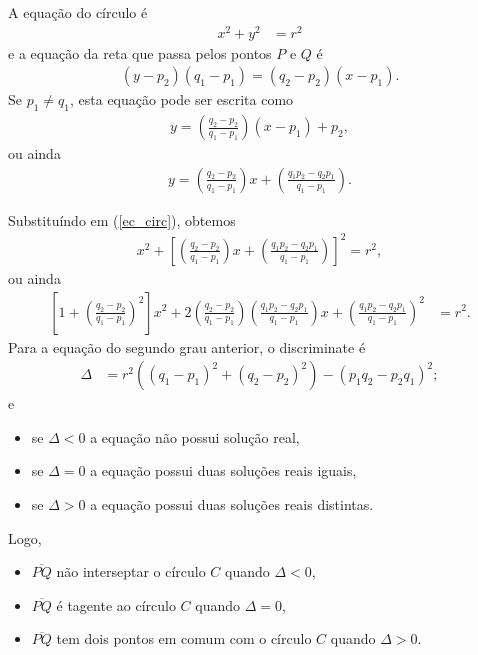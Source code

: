 A equação do círculo é
\begin{align}
    x^2 + y^2 &= r^2
    \label{ec_circ}
\end{align}
e a equação da reta que passa pelos pontos $P$ e $Q$ é
\begin{align*}
    (y-p_2)(q_1-p_1)=(q_2-p_2)(x-p_1).
\end{align*}
Se $p_1\neq q_1$, esta equação pode ser escrita como
\begin{align*}
    y=\left(\frac{q_2-p_2}{q_1-p_1}\right)\left(x-p_1\right)+p_2,
\end{align*}
ou ainda
\begin{align*}
    y = \left( \frac{q_2 - p_2}{q_1 - p_1} \right)x + \left(
    \frac{q_1 p_2 - q_2 p_1}{q_1 - p_1} \right).
\end{align*}

Substituíndo em (\ref{ec_circ}), obtemos
\begin{align*}
    x^2  + \left[ \left( \frac{q_2 - p_2}{q_1 - p_1} \right) x + \left(
    \frac{q_1 p_2 - q_2 p_1}{q_1 - p_1} \right) \right]^2  = r^2,
\end{align*}
ou ainda
\begin{align*}
    \left[ 1 + \left( \frac{q_2 - p_2}{q_1 - p_1} \right)^2 \right] x^2 +
    2 \left( \frac{q_2 - p_2}{q_1 - p_1} \right) \left( \frac{q_1 p_2 - q_2
    p_1}{q_1 - p_1} \right) x + \left( 
    \frac{q_1 p_2 - q_2 p_1}{q_1 - p_1} \right)^2 & = r^2.
\end{align*}
Para a equação do segundo grau anterior, o discriminate é
\begin{align*}
    \Delta &= r^2 \left( \left( q_1 - p_1 \right)^2 + \left( q_2 - p_2
    \right)^2 \right) - \left( p_1 q_2 - p_2 q_1 \right)^2;
\end{align*}
e
\begin{itemize}
    \item se $\Delta < 0$ a equação não possui solução real,
    \item se $\Delta = 0$ a equação possui duas soluções reais iguais,
    \item se $\Delta > 0$ a equação possui duas soluções reais distintas.
\end{itemize}
Logo,
\begin{itemize}
    \item $\overline{PQ}$ não interseptar o círculo $C$ quando $\Delta < 0$,
    \item $\overline{PQ}$ é tagente ao círculo $C$ quando $\Delta = 0$,
    \item $\overline{PQ}$ tem dois pontos em comum com o círculo $C$ quando
        $\Delta > 0$.
\end{itemize}
